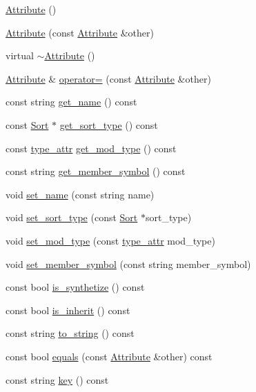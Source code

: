 \begin{CompactItemize}
\item 
\hyperlink{classgenevalmag_1_1Attribute_ac01d62e0d5fc5448b03be75e8f74248}{Attribute} ()
\item 
\hyperlink{classgenevalmag_1_1Attribute_6f7d7f355ad08b739593f77fc782a731}{Attribute} (const \hyperlink{classgenevalmag_1_1Attribute}{Attribute} \&other)
\item 
virtual \hyperlink{classgenevalmag_1_1Attribute_00058e8a31423fe3d2d2a2127090eba0}{$\sim$Attribute} ()
\item 
\hyperlink{classgenevalmag_1_1Attribute}{Attribute} \& \hyperlink{classgenevalmag_1_1Attribute_ac5ff69cd1074e47a7794db8c65bff42}{operator=} (const \hyperlink{classgenevalmag_1_1Attribute}{Attribute} \&other)
\item 
const string \hyperlink{classgenevalmag_1_1Attribute_c44b53232e4656b7e734bcbb942bddfe}{get\_\-name} () const 
\item 
const \hyperlink{classgenevalmag_1_1Sort}{Sort} $\ast$ \hyperlink{classgenevalmag_1_1Attribute_5e04e4baa950b3c80ecbab0bf9cc56da}{get\_\-sort\_\-type} () const 
\item 
const \hyperlink{namespacegenevalmag_0ae71e3da3851df63075a93820da40af}{type\_\-attr} \hyperlink{classgenevalmag_1_1Attribute_365a6121af9f7c698cecfc930568afc1}{get\_\-mod\_\-type} () const 
\item 
const string \hyperlink{classgenevalmag_1_1Attribute_5ff83a32a045e22648ff4c1ecff37c6b}{get\_\-member\_\-symbol} () const 
\item 
void \hyperlink{classgenevalmag_1_1Attribute_295fa8b9fd96ca034adb8acd0c89b7ce}{set\_\-name} (const string name)
\item 
void \hyperlink{classgenevalmag_1_1Attribute_871202067081b9fa79e53c870fb9c3d2}{set\_\-sort\_\-type} (const \hyperlink{classgenevalmag_1_1Sort}{Sort} $\ast$sort\_\-type)
\item 
void \hyperlink{classgenevalmag_1_1Attribute_5145c88f9e2e6e797996e6a31a2492fb}{set\_\-mod\_\-type} (const \hyperlink{namespacegenevalmag_0ae71e3da3851df63075a93820da40af}{type\_\-attr} mod\_\-type)
\item 
void \hyperlink{classgenevalmag_1_1Attribute_72b9d591826fcd33079edab94855c312}{set\_\-member\_\-symbol} (const string member\_\-symbol)
\item 
const bool \hyperlink{classgenevalmag_1_1Attribute_adba4924920a427077f71234c9beb3b5}{is\_\-synthetize} () const 
\item 
const bool \hyperlink{classgenevalmag_1_1Attribute_1943bd98897321547a21177d4efcf302}{is\_\-inherit} () const 
\item 
const string \hyperlink{classgenevalmag_1_1Attribute_27c1b94db4a836b9fcda1d26146d1db6}{to\_\-string} () const 
\item 
const bool \hyperlink{classgenevalmag_1_1Attribute_1fa5839094c3ea82c49d1ee6319344ae}{equals} (const \hyperlink{classgenevalmag_1_1Attribute}{Attribute} \&other) const 
\item 
const string \hyperlink{classgenevalmag_1_1Attribute_6692cef1261bf52199e8fbc81c15f010}{key} () const 
\end{CompactItemize}
